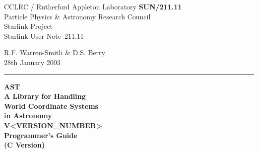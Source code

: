 \documentclass[twoside,11pt]{article}
\newcommand{\stardoccategory}  {Starlink User Note}
\newcommand{\stardocinitials}  {SUN}
\newcommand{\stardocnumber}    {211.11}
\newcommand{\stardocnumber}    {210.11}
\newcommand{\stardocauthors}   {R.F. Warren-Smith \& D.S. Berry}
\newcommand{\stardocdate}      {28th January 2003}
\newcommand{\stardoctitle}     {AST\\
                                A Library for Handling\\
                                World Coordinate Systems\\
                                in Astronomy}
\newcommand{\stardocversion}   {V<VERSION_NUMBER>}
\newcommand{\stardocmanual}    {Programmer's Guide\\(C Version)}
\newcommand{\stardocmanual}    {Programmer's Guide\\(Fortran Version)}
\newcommand{\stardocname}{\stardocinitials /\stardocnumber}
\newenvironment{latexonly}{}{}
\begin{document}
\thispagestyle{empty}

\begin{latexonly}
   CCLRC / {\sc Rutherford Appleton Laboratory} \hfill {\bf \stardocname}\\
   {\large Particle Physics \& Astronomy Research Council}\\
   {\large Starlink Project\\}
   {\large \stardoccategory\ \stardocnumber}
   \begin{flushright}
   \stardocauthors\\
   \stardocdate
   \end{flushright}
   \vspace{-4mm}
   \rule{\textwidth}{0.5mm}
   \vspace{-7mm}
   \begin{center}
   {\Huge\bf  \stardoctitle \\ [2.0ex]}
   {\LARGE\bf \stardocversion \\ [1.0ex]}
   {\Huge\bf  \stardocmanual}
   \end{center}


\end{latexonly}
\end{document}
